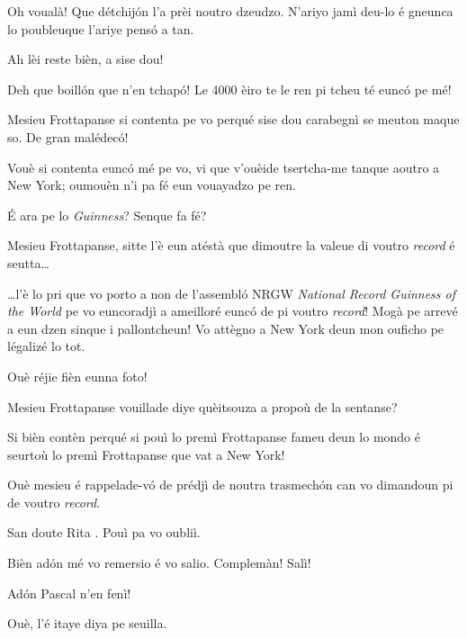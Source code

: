 \begin{drama}

\Ritaspeaks Oh voualà! Que détchijón l’a prèi  noutro dzeudzo. N'ariyo jamì deu-lo é gneunca lo poubleuque l'ariye pensó a tan.

\Cienspeaks Ah lèi reste bièn, a sise dou!

\Ticspeaks{} Deh que boillón que n'en tchapó! Le 4000 èiro te le ren pi tcheu té eunc\'o pe mé!

\Ritaspeaks Mesieu Frottapanse si contenta pe vo perqué sise dou carabegnì se meuton maque so. De gran malédec\'o!

\Tissotspeaks Vouè si contenta eunc\'o mé pe vo, vi que v'ouèide tser\-tcha-me tanque aoutro a New York; oumouèn n’i pa fé eun vouayadzo pe ren.

\Cienspeaks É ara pe lo \textit{Guinness}? Senque fa fé?

\Tissotspeaks Mesieu Frottapanse, sitte l’è eun atéstà que dimoutre la valeue di voutro \textit{record} é seutta\ldots


\Tissotspeaks \ldots l’è lo pri que vo porto a non de l’assembló NRGW \textit{National Record Guinness of the World} pe vo euncoradjì a ame\-illo\-ré eunc\'o de pi voutro \textit{record}!  Mogà pe arrevé a eun dzen sinque i pallontcheun! Vo attègno a New York deun mon ouficho pe légalizé lo tot.

\Ritaspeaks Ouè réjie fièn eunna foto!


\Ritaspeaks Mesieu Frottapanse vouillade diye quèitsouza a propoù de la sentanse?

\Cienspeaks Si bièn contèn perqué si pouì lo premì Frottapanse fameu deun lo mondo é seurtoù lo premì Frottapanse que vat a New York!

\Ritaspeaks Ouè mesieu é rappelade-v\'o de prédjì de noutra trasmechón can vo dimandoun pi de voutro \textit{record}.

\Cienspeaks San doute Rita \ok. Pouì pa vo oubliì.

\Ritaspeaks  Bièn ad\'on mé vo remersio é vo salio. Complemàn! Salì!


\Ritaspeaks Adón Pascal n'en fenì!

\Pascalspeaks Ouè, l’é itaye diya pe seuilla.


\end{drama}
